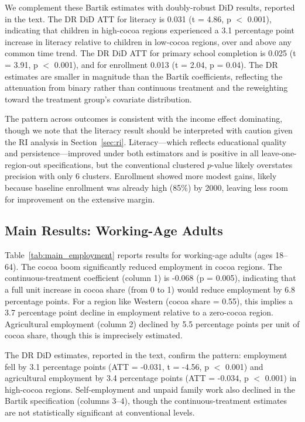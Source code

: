\documentclass[12pt]{article}
\begin{document}
We complement these Bartik estimates with doubly-robust DiD results, reported in the text. The DR DiD ATT for literacy is 0.031 (t = 4.86, p $<$ 0.001), indicating that children in high-cocoa regions experienced a 3.1 percentage point increase in literacy relative to children in low-cocoa regions, over and above any common time trend. The DR DiD ATT for primary school completion is 0.025 (t = 3.91, p $<$ 0.001), and for enrollment 0.013 (t = 2.04, p = 0.04). The DR estimates are smaller in magnitude than the Bartik coefficients, reflecting the attenuation from binary rather than continuous treatment and the reweighting toward the treatment group's covariate distribution.

The pattern across outcomes is consistent with the income effect dominating, though we note that the literacy result should be interpreted with caution given the RI analysis in Section~\ref{sec:ri}. Literacy---which reflects educational quality and persistence---improved under both estimators and is positive in all leave-one-region-out specifications, but the conventional clustered $p$-value likely overstates precision with only 6 clusters. Enrollment showed more modest gains, likely because baseline enrollment was already high (85\%) by 2000, leaving less room for improvement on the extensive margin.

\subsection{Main Results: Working-Age Adults}



Table~\ref{tab:main_employment} reports results for working-age adults (ages 18--64). The cocoa boom significantly reduced employment in cocoa regions. The continuous-treatment coefficient (column 1) is -0.068 (p = 0.005), indicating that a full unit increase in cocoa share (from 0 to 1) would reduce employment by 6.8 percentage points. For a region like Western (cocoa share = 0.55), this implies a 3.7 percentage point decline in employment relative to a zero-cocoa region. Agricultural employment (column 2) declined by 5.5 percentage points per unit of cocoa share, though this is imprecisely estimated.

The DR DiD estimates, reported in the text, confirm the pattern: employment fell by 3.1 percentage points (ATT = -0.031, t = -4.56, p $<$ 0.001) and agricultural employment by 3.4 percentage points (ATT = -0.034, p $<$ 0.001) in high-cocoa regions. Self-employment and unpaid family work also declined in the Bartik specification (columns 3--4), though the continuous-treatment estimates are not statistically significant at conventional levels.
\end{document}
